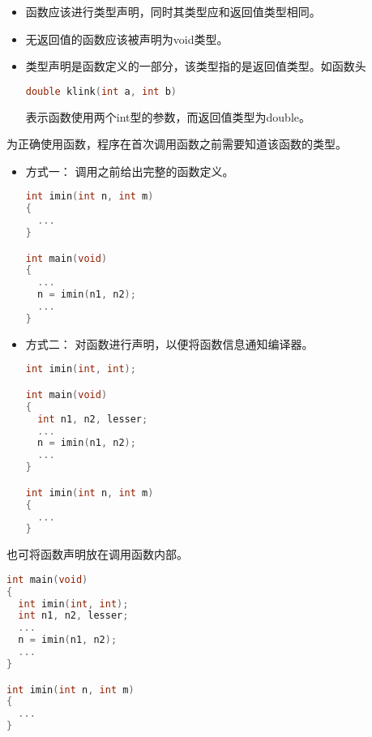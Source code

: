 \begin{frame}[fragile]
\begin{itemize}
\item
函数应该进行类型声明，同时其类型应和返回值类型相同。\\[0.1in]
\item
无返回值的函数应该被声明为{\tf void}类型。\\[0.1in]
\item
类型声明是函数定义的一部分，该类型指的是返回值类型。如函数头
\begin{lstlisting}[language=c,backgroundcolor=\color{red!10}]
double klink(int a, int b)
\end{lstlisting}
表示函数使用两个{\tf int}型的参数，而返回值类型为{\tf double}。
\end{itemize}
\end{frame}

\begin{frame}[fragile]
为正确使用函数，程序在首次调用函数之前需要知道该函数的类型。
\begin{itemize}
\item 方式一：
调用之前给出完整的函数定义。\\[0.1in]
\begin{lstlisting}[language=c,backgroundcolor=\color{red!10}]
int imin(int n, int m)
{
  ... 
}

int main(void)
{
  ...
  n = imin(n1, n2);
  ...
}
\end{lstlisting}
\end{itemize}
\end{frame}

\begin{frame}[fragile]
\begin{itemize}
\item 方式二：
对函数进行声明，以便将函数信息通知编译器。\\[0.1in]
\begin{lstlisting}[language=c,backgroundcolor=\color{red!10}]
int imin(int, int);

int main(void)
{
  int n1, n2, lesser;
  ...
  n = imin(n1, n2);
  ...
}

int imin(int n, int m)
{
  ... 
}
\end{lstlisting}
\end{itemize}
\end{frame}

\begin{frame}[fragile]
也可将函数声明放在调用函数内部。 
\begin{lstlisting}[language=c,backgroundcolor=\color{red!10}]
int main(void)
{
  int imin(int, int);
  int n1, n2, lesser;
  ...
  n = imin(n1, n2);
  ...
}

int imin(int n, int m)
{
  ... 
}
\end{lstlisting}
\end{frame}

